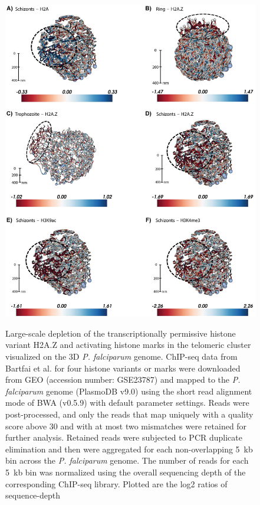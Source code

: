 \begin{figure}
\includegraphics[width=\linewidth]{figures/fig2.png}
\label{fig:3D}
\caption{
Large-scale depletion of the transcriptionally permissive histone variant
H2A.Z and activating histone marks in the telomeric cluster
visualized on the 3D \textit{P. falciparum} genome. ChIP-seq data from Bartfai et al.
\citet{bartfai:h2az} for four histone variants or marks were downloaded from
GEO (accession number: GSE23787) and mapped to the \textit{P. falciparum} genome
(PlasmoDB v9.0) using the short read alignment mode of
BWA (v0.5.9) \citep{li:fast} with default parameter settings.
Reads were post-processed,
and only the reads that map uniquely with a quality score
above 30 and with at most two mismatches were retained for further analysis.
Retained reads were subjected to PCR duplicate elimination
and then were aggregated for each non-overlapping 5~kb bin across the \textit{P.
falciparum} genome. The number of reads for each 5~kb bin was
normalized using the overall sequencing depth of the corresponding ChIP-seq
library. Plotted are the log2 ratios of sequence-depth
}
\end{figure}
